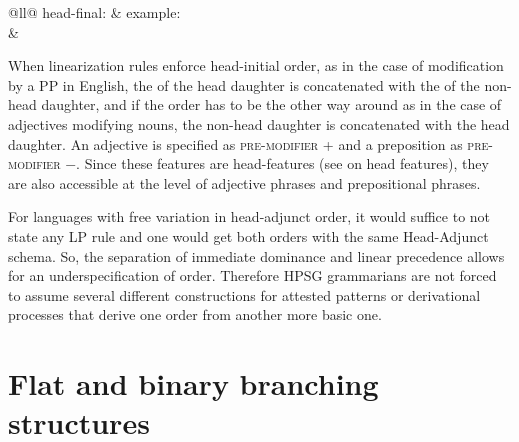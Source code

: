 \documentclass[output=paper
                ,modfonts
                ,nonflat
	        ,collection
	        ,collectionchapter
	        ,collectiontoclongg
 	        ,biblatex
                ,babelshorthands
                ,newtxmath
                ,draftmode
                ,colorlinks, citecolor=brown
]{./langsci/langscibook}
\begin{document}
\ex \begin{tabular}[t]{@{}ll@{}}
head-final:                            & example:\\
%
&%
\\
\end{tabular}
\zl
When linearization rules enforce head-initial order, as in the case of modification by a PP in
English, the \phonv of the head daughter is concatenated with the \phonv of the non-head daughter,
and if the order has to be the other way around as in the case of adjectives modifying nouns, the
non-head daughter is concatenated with the head daughter. An adjective is specified as
\textsc{pre-modifier} + and a preposition as \textsc{pre-modifier} $-$. Since these features are
head-features (see  on head features), they are also accessible at the
level of adjective phrases and prepositional phrases.

For languages with free variation in head-adjunct order, it would suffice to not state any LP
rule and one would get both orders with the same Head-Adjunct schema. So, the separation of
immediate dominance and linear precedence allows for an underspecification of order. Therefore HPSG
grammarians are not forced to assume several different constructions for attested patterns or
derivational processes that derive one order from another more basic one.


\section{Flat and binary branching structures}
\label{sec-binary-flat}
\end{document}
